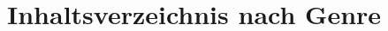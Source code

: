 \documentclass[a4paper, 10pt, twoside]{article}
\begin{document}
     

\pagebreak
\pagestyle{fancy}\fancyfoot{}
\section*{Inhaltsverzeichnis nach Genre}
\begin{multicols}{2}
\tableofcontents
\end{multicols}
\clearpage
\printindex
\clearpage



\fancyhf{}
\pagebreak

\end{document}
